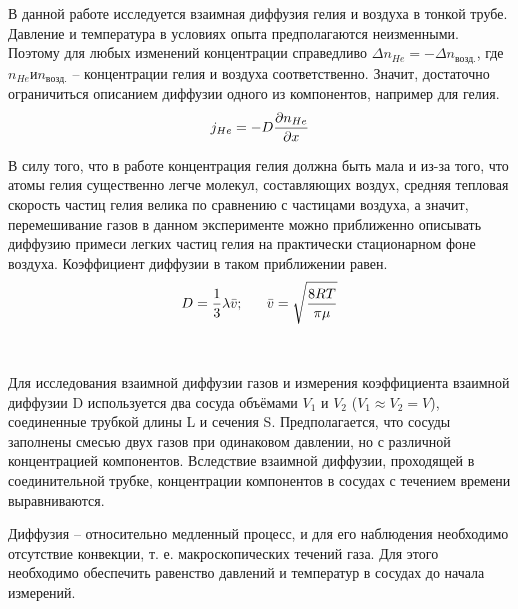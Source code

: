 \documentclass[a4paper, 12pt]{article}%
\begin{document}
В данной работе исследуется взаимная диффузия гелия и воздуха в тонкой трубе. Давление и температура в условиях опыта предполагаются неизменными. Поэтому для любых изменений концентрации справедливо $\Delta n_{He} = - \Delta n_{\text{возд.}}$, где $n_{He} и n_{возд.}$ -- концентрации гелия и воздуха соответственно. Значит, достаточно ограничиться описанием диффузии одного из компонентов, например для гелия. \\
\begin{equation*}
	j_{He} = -D\frac{\partial n_{He}}{\partial x}\\
\end{equation*}


В силу того, что в работе концентрация гелия должна быть мала и из-за того, что атомы гелия существенно легче молекул, составляющих воздух, средняя тепловая скорость частиц гелия велика по сравнению с частицами воздуха, а значит, перемешивание газов в данном эксперименте можно приближенно описывать диффузию примеси легких частиц гелия на практически стационарном фоне воздуха. Коэффициент диффузии в таком приближении равен.  \\
\begin{equation*}
	D = \frac{1}{3} \lambda \bar{v}; \ \ \ \ \ \bar{v} = \sqrt{\frac{8RT}{\pi \mu}}\\
\end{equation*}
\begin{center}
	\begin{minipage}{0.1\textwidth}
	\end{minipage}
	\begin{minipage}{0.15\textwidth}
		\
	\end{minipage}
\end{center}


		Для исследования взаимной диффузии газов и измерения коэффициента взаимной диффузии D используется два сосуда объёмами $V_1$ и $V_2$ ($V_1 \approx V_2 = V$), соединенные трубкой длины L и сечения S. Предполагается, что сосуды заполнены смесью двух газов при одинаковом давлении, но с различной концентрацией компонентов. Вследствие взаимной диффузии, проходящей в соединительной трубке, концентрации компонентов в сосудах с течением времени выравниваются.
		
		
Диффузия -- относительно медленный процесс, и для его наблюдения необходимо отсутствие конвекции, т. е. макроскопических течений газа. Для этого необходимо обеспечить равенство давлений и температур в сосудах до начала измерений.\\ 
\end{document}
